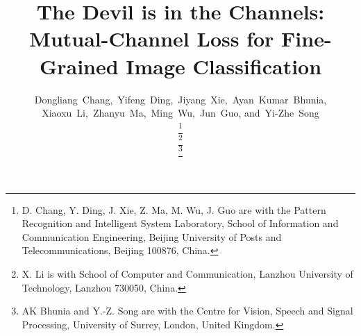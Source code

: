 \documentclass[journal]{IEEEtran}
\begin{document}
\title{The Devil is in the Channels: Mutual-Channel Loss for Fine-Grained Image Classification}






\author{Dongliang~Chang,~Yifeng~Ding,~Jiyang~Xie,~Ayan~Kumar~Bhunia,
Xiaoxu~Li,~Zhanyu~Ma,~Ming~Wu,~Jun~Guo, and~Yi-Zhe~Song 




\thanks{D. Chang, Y. Ding, J. Xie, Z. Ma, M. Wu, J. Guo are with the Pattern Recognition and Intelligent
System Laboratory, School of Information and Communication Engineering, Beijing University of Posts and Telecommunications, Beijing 100876, China.}

\thanks{X. Li is with School of Computer and Communication, Lanzhou University of Technology, Lanzhou 730050, China.}


\thanks{AK Bhunia and Y.-Z. Song  are with the  Centre for Vision, Speech and Signal Processing, University of Surrey, London, United Kingdom.}}























\maketitle
\end{document}
